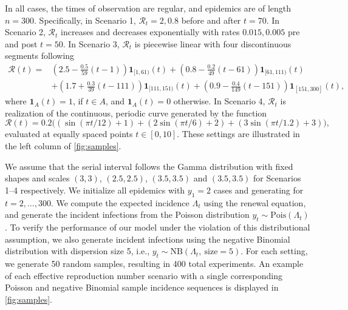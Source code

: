 \documentclass[10pt,letterpaper]{article}
\newcommand{\lr}[1]{\left(#1\right)}
\def\calR{\mathcal{R}}
\begin{document}
In all cases, the times of observation are regular, and epidemics are of
length $n=300$. Specifically, in Scenario 1, $\calR_t = 2, 0.8$ before and after
$t=70$. In Scenario 2, $\calR_t$ increases and decreases exponentially with
rates $0.015, 0.005$ pre and post $t=50$. 
In Scenario 3, $\calR_t$ is piecewise linear with four discontinuous segments following 
\begin{equation}
  \begin{split}
    \calR(t) =& \lr{2.5 - \frac{0.5}{59}\lr{t-1}} \boldsymbol{1}_{[1,61)}(t)
     + \lr{0.8 - \frac{0.2}{49}\lr{t-61}} \boldsymbol{1}_{[61,111)}(t) \\
    & + \lr{1.7 + \frac{0.3}{39}\lr{t-111}} \boldsymbol{1}_{[111,151)}(t)
       + \lr{0.9 - \frac{0.4}{149}\lr{t-151}} \boldsymbol{1}_{[151,300]}(t),
  \end{split}
\end{equation}
where $\boldsymbol{1}_{A}(t) = 1$, if $t\in A$, and $\boldsymbol{1}_{A}(t)=0$ otherwise. 
In Scenario 4, $\calR_t$ is realization of the 
continuous, periodic curve generated by the function 
\begin{equation}
  \calR(t) = 0.2 \big(\lr{\sin(\pi t/12) + 1} + \lr{2 \sin\lr{\pi t / 6} + 2} 
  + \lr{3 \sin(\pi t / 1.2) + 3}\big),
\end{equation} 
evaluated at equally spaced points $t\in [0,10]$. 
These settings are illustrated in the left column of \autoref{fig:samples}.


We assume that the serial interval follows the Gamma distribution with fixed
shapes and scales $(3,3)$, $(2.5,2.5)$, $(3.5,3.5)$ and $(3.5,3.5)$ for
Scenarios 1--4 respectively. We initialize all epidemics with $y_1=2$ cases and
generating for $t=2,\ldots,300$. We compute the expected incidence $\Lambda_t$
using the renewal equation, and generate the incident infections from the
Poisson distribution $y_t\sim \textrm{Pois}(\Lambda_t)$. To verify the
performance of our model under the violation of this distributional assumption,
we also generate incident infections using the negative Binomial distribution
with dispersion size 5, i.e., $y_t\sim \textrm{NB}(\Lambda_t,\
\textrm{size}=5)$. For each setting, we generate 50 random samples, resulting in
400 total experiments. An example of each effective reproduction number scenario
with a single corresponding Poisson and negative Binomial sample incidence
sequences is displayed in \autoref{fig:samples}. 
\end{document}
